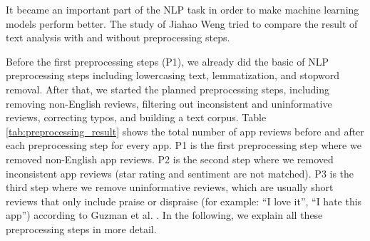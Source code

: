 \documentclass[12pt]{article}
\begin{document}
It became an important part of the NLP task in order to make machine learning models perform better. The study of Jiahao Weng \cite{text_preprocessing_nlp_2} tried to compare the result of text analysis with and without preprocessing steps.

Before the first preprocessing steps (P1), we already did the basic of NLP preprocessing steps including lowercasing text, lemmatization, and stopword removal. After that, we started the planned preprocessing steps, including removing non-English reviews, filtering out inconsistent and uninformative reviews, correcting typos, and building a text corpus. Table \ref{tab:preprocessing_result} shows the total number of app reviews before and after each preprocessing step for every app. P1 is the first preprocessing step where we removed non-English app reviews. P2 is the second step where we removed inconsistent app reviews (star rating and sentiment are not matched). P3 is the third step where we remove uninformative reviews, which are usually short reviews that only include praise or dispraise (for example: “I love it”, “I hate this app”) according to Guzman et al. \cite{fine_grained}. In the following, we explain all these preprocessing steps in more detail.
\end{document}
